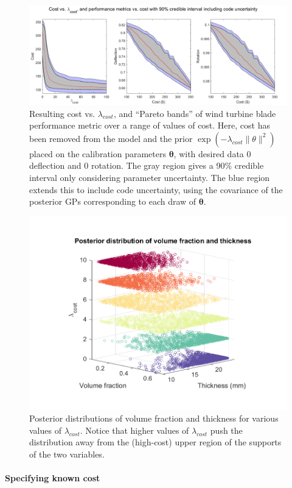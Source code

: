 \documentclass{article}
\begin{document}
\begin{figure}
\centering
\captionsetup{width=.9\linewidth}
\includegraphics[width=\linewidth]{FIG_cost_lambda_code_uncert_upd}
\caption{Resulting cost vs. $\lambda_{cost}$, and ``Pareto bands'' of wind turbine blade performance metric over a range of values of cost. Here, cost has been removed from the model and the prior $\exp(-\lambda_{cost}\lVert \theta \rVert^2)$ placed on the calibration parameters $\boldsymbol \theta$, with desired data 0 deflection and 0 rotation. The gray region gives a 90\% credible interval only considering parameter uncertainty. The blue region extends this to include code uncertainty, using the covariance of the posterior GPs corresponding to each draw of $\boldsymbol \theta$.}
\label{fig:non-uniform_prior}
\end{figure}


\begin{figure}
\centering
\captionsetup{width=.7\linewidth}
\includegraphics[width=.65\linewidth]{FIG_post_dist_across_cost_lambda-3d}
\caption{Posterior distributions of volume fraction and thickness for various values of $\lambda_{cost}.$ Notice that higher values of $\lambda_{cost}$ push the distribution away from the (high-cost) upper region of the supports of the two variables.}
\label{fig:post_dists_lambda_cost}
\end{figure}


\paragraph{Specifying known cost}\label{known_cost}
\end{document}
